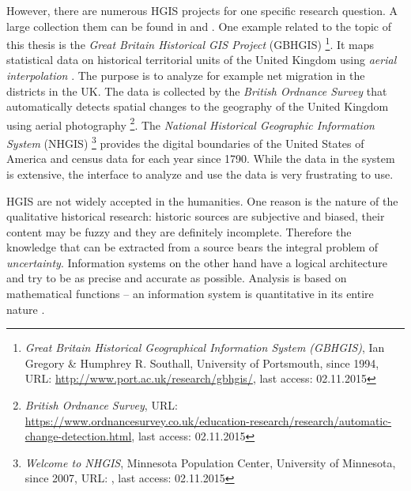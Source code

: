 However, there are numerous HGIS projects for one specific research question. A large collection them can be found in \cite{knowles2008placing} and \cite{gregory2014toward}.
One example related to the topic of this thesis is the \emph{Great Britain Historical GIS Project} (GBHGIS)
\footnote{
  \textit{Great Britain Historical Geographical Information System (GBHGIS)},
  Ian Gregory \& Humphrey R. Southall, University of Portsmouth, since 1994,
  URL: \url{http://www.port.ac.uk/research/gbhgis/},
  last access: 02.11.2015
}.
It maps statistical data on historical territorial units of the United Kingdom using \emph{aerial interpolation}
\cite{aerialInterpolation}.
The purpose is to analyze for example net migration in the districts in the UK. The data is collected by the \emph{British Ordnance Survey} that automatically detects spatial changes to the geography of the United Kingdom using aerial photography
\footnote{
  \textit{British Ordnance Survey},
  URL: \url{https://www.ordnancesurvey.co.uk/education-research/research/automatic-change-detection.html},
  last access: 02.11.2015
}.
The \emph{National Historical Geographic Information System} (NHGIS)
\footnote{
  \textit{Welcome to NHGIS},
  Minnesota Population Center, University of Minnesota,
  since 2007,
  URL: \url{},
  last access: 02.11.2015
}
provides the digital boundaries of the United States of America and census data for each year since 1790. While the data in the system is extensive, the interface to analyze and use the data is very frustrating to use.

HGIS are not widely accepted in the humanities. One reason is the nature of the qualitative historical research: historic sources are subjective and biased, their content may be fuzzy and they are definitely incomplete. Therefore the knowledge that can be extracted from a source bears the integral problem of \emph{uncertainty}. Information systems on the other hand have a logical architecture and try to be as precise and accurate as possible. Analysis is based on mathematical functions -- an information system is quantitative in its entire nature
\cite[p. 2]{knowles2008placing}.



